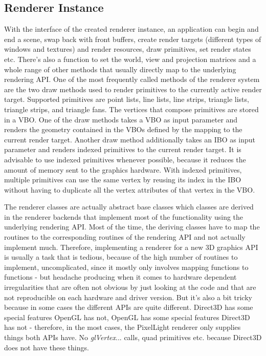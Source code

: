 \subsection{Renderer Instance}
With the interface of the created renderer instance, an application can begin and end a scene, swap back with front buffers, create render targets (different types of windows and textures) and render resources, draw primitives, set render states etc. There's also a function to set the world, view and projection matrices and a whole range of other methods that usually directly map to the underlying rendering \ac{API}. One of the most frequently called methods of the renderer system are the two draw methods used to render primitives to the currently active render target. Supported primitives are point lists, line lists, line strips, triangle lists, triangle strips, and triangle fans. The vertices that compose primitives are stored in a \ac{VBO}. One of the draw methods takes a \ac{VBO} as input parameter and renders the geometry contained in the \ac{VBO}s defined by the mapping to the current render target. Another draw method additionally takes an \ac{IBO} as input parameter and renders indexed primitives to the current render target. It is advisable to use indexed primitives whenever possible, because it reduces the amount of memory sent to the graphics hardware. With indexed primitives, multiple primitives can use the same vertex by reusing its index in the \ac{IBO} without having to duplicate all the vertex attributes of that vertex in the \ac{VBO}.

The renderer classes are actually abstract base classes which classes are derived in the renderer backends that implement most of the functionality using the underlying rendering \ac{API}. Most of the time, the deriving classes have to map the routines to the corresponding routines of the rendering \ac{API} and not actually implement much. Therefore, implementing a renderer for a new 3D graphics \ac{API} is usually a task that is tedious, because of the high number of routines to implement, uncomplicated, since it mostly only involves mapping functions to functions - but headache producing when it comes to hardware dependent irregularities that are often not obvious by just looking at the code and that are not reproducible on each hardware and driver version. But it's also a bit tricky because in some cases the different \ac{API}s are quite different. Direct3D has some special features \ac{OpenGL} has not, \ac{OpenGL} has some special features Direct3D has not - therefore, in the most cases, the PixelLight renderer only supplies things both \ac{API}s have. No \emph{glVertex}... calls, quad primitives etc. because Direct3D does not have these things.




